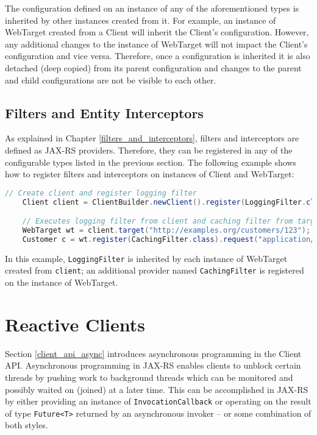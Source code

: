 The configuration defined on an instance of any of the aforementioned types is inherited by other instances created from
it. For example, an instance of WebTarget created from a Client will inherit the Client's configuration. However, any
additional changes to the instance of WebTarget will not impact the Client's configuration and vice versa. Therefore,
once a configuration is inherited it is also detached (deep copied) from its parent configuration and changes to the
parent and child configurations are not be visible to each other.

\subsection{Filters and Entity Interceptors}
\label{filters_interceptors_client}

As explained in Chapter \ref{filters_and_interceptors}, filters and interceptors are defined as JAX-RS providers.
Therefore, they can be registered in any of the configurable types listed in the previous section. The following example
shows how to register filters and interceptors on instances of Client and WebTarget:

\begin{lstlisting}[language=Java]
    // Create client and register logging filter
    Client client = ClientBuilder.newClient().register(LoggingFilter.class);

    // Executes logging filter from client and caching filter from target
    WebTarget wt = client.target("http://examples.org/customers/123");
    Customer c = wt.register(CachingFilter.class).request("application/xml").get(Customer.class);
\end{lstlisting}

In this example, \lstinline{LoggingFilter} is inherited by each instance of WebTarget created from \lstinline{client};
an additional provider named \lstinline{CachingFilter} is registered on the instance of WebTarget.

\section{Reactive Clients}
\label{reactive_clients}

Section \ref{client_api_async} introduces asynchronous programming in the Client API. Asynchronous programming in JAX-RS
enables clients to unblock certain threads by pushing work to background threads which can be monitored and possibly
waited on (joined) at a later time. This can be accomplished in JAX-RS by either providing an instance of
\lstinline{InvocationCallback} or operating on the result of type \lstinline{Future<T>} returned by an asynchronous
invoker -- or some combination of both styles.

